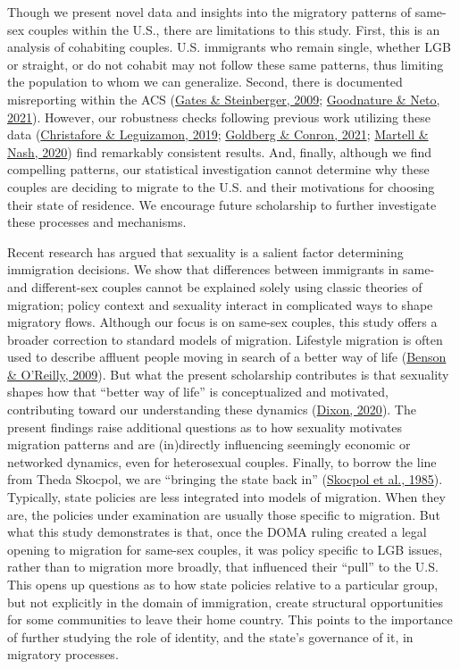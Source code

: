 \documentclass[
  11pt,
]{article}
\begin{document}
Though we present novel data and insights into the migratory patterns of same-sex couples within the U.S., there are limitations to this study. First, this is an analysis of cohabiting couples. U.S. immigrants who remain single, whether LGB or straight, or do not cohabit may not follow these same patterns, thus limiting the population to whom we can generalize. Second, there is documented misreporting within the ACS (\protect\hyperlink{ref-gates_2009}{Gates \& Steinberger, 2009}; \protect\hyperlink{ref-goodnature_2021}{Goodnature \& Neto, 2021}). However, our robustness checks following previous work utilizing these data (\protect\hyperlink{ref-christafore_2019}{Christafore \& Leguizamon, 2019}; \protect\hyperlink{ref-goldberg_2021}{Goldberg \& Conron, 2021}; \protect\hyperlink{ref-martell_2020}{Martell \& Nash, 2020}) find remarkably consistent results. And, finally, although we find compelling patterns, our statistical investigation cannot determine why these couples are deciding to migrate to the U.S. and their motivations for choosing their state of residence. We encourage future scholarship to further investigate these processes and mechanisms.

Recent research has argued that sexuality is a salient factor determining immigration decisions. We show that differences between immigrants in same- and different-sex couples cannot be explained solely using classic theories of migration; policy context and sexuality interact in complicated ways to shape migratory flows. Although our focus is on same-sex couples, this study offers a broader correction to standard models of migration. Lifestyle migration is often used to describe affluent people moving in search of a better way of life (\protect\hyperlink{ref-benson_2009}{Benson \& O'Reilly, 2009}). But what the present scholarship contributes is that sexuality shapes how that ``better way of life'' is conceptualized and motivated, contributing toward our understanding these dynamics (\protect\hyperlink{ref-dixon_2020}{Dixon, 2020}). The present findings raise additional questions as to how sexuality motivates migration patterns and are (in)directly influencing seemingly economic or networked dynamics, even for heterosexual couples. Finally, to borrow the line from Theda Skocpol, we are ``bringing the state back in'' (\protect\hyperlink{ref-skocpol_1985}{Skocpol et al., 1985}). Typically, state policies are less integrated into models of migration. When they are, the policies under examination are usually those specific to migration. But what this study demonstrates is that, once the DOMA ruling created a legal opening to migration for same-sex couples, it was policy specific to LGB issues, rather than to migration more broadly, that influenced their ``pull'' to the U.S. This opens up questions as to how state policies relative to a particular group, but not explicitly in the domain of immigration, create structural opportunities for some communities to leave their home country. This points to the importance of further studying the role of identity, and the state's governance of it, in migratory processes.
\end{document}
